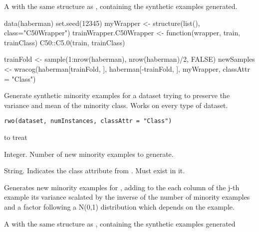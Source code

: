%
\begin{Value}
A  with the same structure as ,
containing the synthetic examples generated.
\end{Value}
%
\begin{Examples}
\begin{ExampleCode}
data(haberman)
set.seed(12345)
myWrapper <- structure(list(), class="C50Wrapper")
trainWrapper.C50Wrapper <- function(wrapper, train, trainClass){
  C50::C5.0(train, trainClass)
}

trainFold <- sample(1:nrow(haberman), nrow(haberman)/2, FALSE)
newSamples <- wracog(haberman[trainFold, ], haberman[-trainFold, ],
                     myWrapper, classAttr = "Class")

\end{ExampleCode}
\end{Examples}
%
\begin{Description}\relax
Generate synthetic minority examples for a dataset trying to preserve the
variance and mean of the minority class. Works on every type of dataset.
\end{Description}
%
\begin{Usage}
\begin{verbatim}
rwo(dataset, numInstances, classAttr = "Class")
\end{verbatim}
\end{Usage}
%
\begin{Arguments}
\begin{ldescription}
\item[\code{dataset}]  to treat

\item[\code{numInstances}] Integer. Number of new minority examples to generate.

\item[\code{classAttr}] String. Indicates the class attribute from .
Must exist in it.
\end{ldescription}
\end{Arguments}
%
\begin{Details}\relax
Generates  new minority examples for ,
adding to the each column of the j-th example its variance scalated by the
inverse of the number of minority examples and a factor following a N(0,1)
distribution which depends on the example.
\end{Details}
%
\begin{Value}
A  with the same structure as ,
containing the synthetic examples generated
\end{Value}
